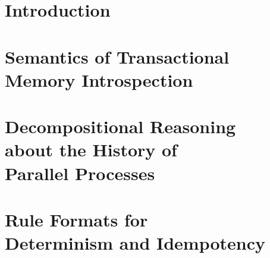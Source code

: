 \documentclass[10pt]{book}
\makeatletter
\theoremstyle{definition}
\theoremstyle{definition}
\newcommand\jointwith\relax
\renewcommand\tableofcontents{%
    \if@twocolumn
      \@restonecoltrue\onecolumn
    \else
      \@restonecolfalse
    \fi
    \chapter*{\contentsname
        \@mkboth{%
           {\upshape\scshape\MakeLowercase\contentsname}}{{\upshape\scshape\MakeLowercase\contentsname}}}%
    \@starttoc{toc}%
    \if@restonecol\twocolumn\fi
    }
\makeatother
\begin{document}
\tableofcontents

\mainmatter{}

\chapter{Introduction}


\renewcommand{\jointwith}{\'Ulfar Erlingsson}
\chapter{Semantics of Transactional Memory Introspection}








\renewcommand{\jointwith}{Luca Aceto, Anna Ing\'olfsdottir,\\ and MohammadReza Mousavi}
\chapter[Decompositional Reasoning about the History of Parallel Processes]{Decompositional Reasoning \\ about the History of \\ Parallel Processes}







\renewcommand{\trans}[1]{\,{\stackrel{{#1}}{\rightarrow}}\,}

\renewcommand{\jointwith}{Luca Aceto, Anna Ing\'olfsdottir,\\ MohammadReza Mousavi and Michel Reniers}
\chapter[Rule Formats for Determinism and Idempotency]{Rule Formats for \\ Determinism and Idempotency}








\end{document}
